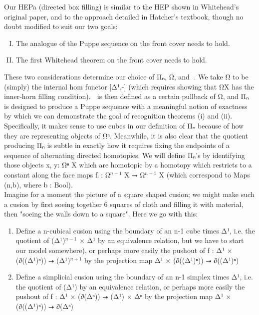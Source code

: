 \documentclass{book}
\theoremstyle{definition}
\begin{document}
Our HEPa (directed box filling) is similar to the HEP shown in Whitehead's original paper, and to the approach detailed in Hatcher's textbook, though no doubt modified to suit our two goals:

\begin{enumerate}[(I)]
\item The analogue of the Puppe sequence on the front cover needs to hold.
\item The first Whitehead theorem on the front cover needs to hold.
\end{enumerate}

These two considerations determine our choice of Π⃗ₙ, Ω⃗, and ω⃗. We take Ω⃗ to be (simply) the internal hom functor [Δ¹,-] (which requires showing that Ω⃗X has the inner-horn filling condition). ω⃗ is then defined as a certain pullback of Ω⃗, and Π⃗ₙ is designed to produce a Puppe sequence with a meaningful notion of exactness by which we can demonstrate the goal of recognition theorems (i) and (ii). Specifically, it makes sense to use cubes in our definition of Π⃗ₙ because of how they are representing objects of Ω⃗ⁿ. Meanwhile, it is also clear that the quotient producing Π⃗ₙ is subtle in exactly how it requires fixing the endpoints of a sequence of alternating directed homotopies. We will define Π⃗ₙ's by identifying those objects x, y: Ω⃗ⁿ X which are homotopic by a homotopy which restricts to a constant along the face maps fᵢ : Ω⃗${}^{n-1}$ X ⭢ Ω⃗${}^{n-1}$ X (which correspond to Maps (n,b), where b : Bool).\\

Imagine for a moment the picture of a square shaped cusion; we might make such a cusion by first soeing together 6 squares of cloth and filling it with material, then "soeing the walls down to a square". Here we go with this:

\begin{enumerate}
\item Define a n-cubical cusion using the boundary of an n-1 cube times Δ¹, i.e. the quotient of (Δ¹)${}^{n-1}$ × Δ¹ by an equivalence relation, but we have to start our model somewhere), or perhaps more easily the pushout of f : Δ¹ × (∂((Δ¹)ⁿ)) ⭢ (Δ¹)${}^{n+1}$ by the projection map Δ¹ × (∂((Δ¹)ⁿ)) ⭢ ∂((Δ¹)ⁿ)
\item Define a simplicial cusion using the boundary of an n-1 simplex times Δ¹, i.e. the quotient of (Δ¹) by an equivalence relation, or perhaps more easily the pushout of f : Δ¹ × (∂(Δⁿ)) ⭢ (Δ¹) × Δⁿ by the projection map Δ¹ × (∂((Δ¹)ⁿ)) ⭢ ∂(Δⁿ)
\end{enumerate}
\end{document}
